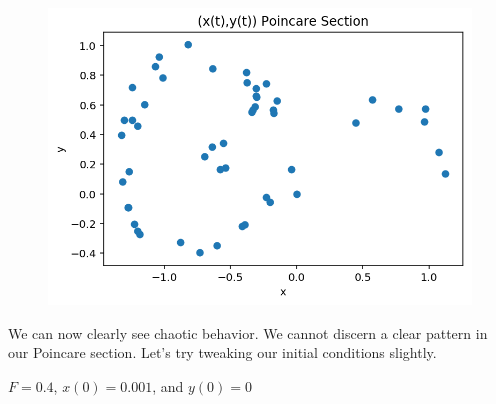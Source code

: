 \documentclass{article}
\begin{document}
\begin{figure}[h!]
\includegraphics[scale=0.4]{poincare5.png}
\end{figure}

We can now clearly see chaotic behavior. We cannot discern a clear pattern in our Poincare section. Let's try tweaking our initial conditions slightly.

$F = 0.4$, $x(0) = 0.001$, and $y(0) = 0$
\end{document}
